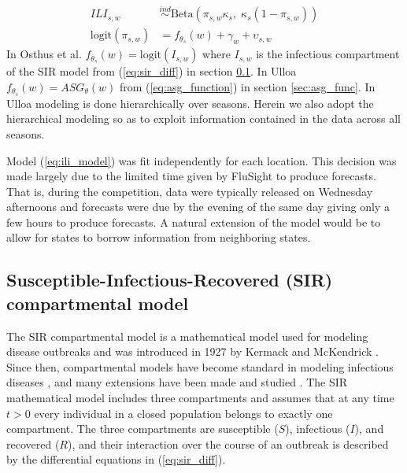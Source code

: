 \begin{equation}
\begin{aligned}
    \label{eq:ili_model}
        ILI_{s,w} &\overset{ind}{\sim} \text{Beta}(\pi_{s,w}\kappa_s,\; \kappa_s(1 - \pi_{s,w})) \\
        \text{logit}(\pi_{s,w}) &= f_{\theta_s}(w) + \gamma_w + \upsilon_{s,w}
\end{aligned}
\end{equation}
In Osthus et al. \cite[]{osthus2019dynamic} 
$f_{\theta_s}(w) = \text{logit}(I_{s,w})$ where $I_{s,w}$ is the infectious 
compartment of the SIR model from (\ref{eq:sir_diff}) in section 
\ref{sec:sir_func}. In Ulloa \cite[]{ulloa2019} 
$f_{\theta_s}(w) = ASG_{\theta}(w)$ from (\ref{eq:asg_function}) in section 
\ref{sec:asg_func}. In Ulloa \cite[]{ulloa2019} modeling is done hierarchically 
over seasons. Herein we also adopt the hierarchical modeling so as to exploit 
information contained in the data across all seasons.

Model (\ref{eq:ili_model}) was fit 
independently for each location. This decision was made largely due to the 
limited time given by FluSight to produce forecasts. That is,
during the competition, data were typically released on Wednesday afternoons and
forecasts were due by the evening of the same day giving only a few hours to 
produce forecasts. A natural extension of the model would be to allow for states
to borrow information from neighboring states.



\subsection{Susceptible-Infectious-Recovered (SIR) compartmental model} \label{sec:sir_func}

The SIR compartmental model is a mathematical model used for modeling disease 
outbreaks and was introduced in 1927 by Kermack and McKendrick 
\cite[]{kermack1927contribution}. Since then, compartmental models have 
become standard in modeling infectious diseases 
\cite[]{allen2008mathematical}, and many extensions have been made and 
studied \cite[for example]{simon2020sir, allen2017primer, van2008deterministic}. 
The SIR mathematical model includes three compartments and assumes that at 
any time $t>0$ every individual in a closed population belongs to exactly 
one compartment. The three compartments are susceptible ($S$), infectious ($I$), 
and recovered ($R$), and their interaction over the course of an outbreak is 
described by the differential equations in (\ref{eq:sir_diff}).    

